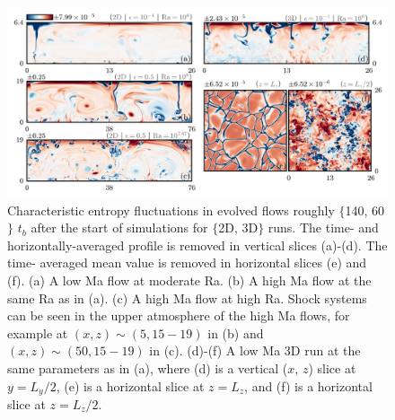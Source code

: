 \begin{figure}[t!]
\includegraphics[width=\textwidth]{./figs/snapshots_fig_raster.pdf}
\caption[Flow morphology of 2D, 3D, and low and high Mach number flows.]
{
	Characteristic entropy fluctuations in evolved flows roughly $\{$140, 60$\}$ $t_b$ after the start of simulations for $\{$2D, 3D$\}$ runs. 
	The time- and horizontally-averaged profile is removed in vertical slices (a)-(d). 
	The time- averaged mean value is removed in horizontal slices (e) and (f).
	(a) A low Ma flow at moderate Ra. 
	(b) A high Ma flow at the same Ra as in (a).
	(c) A high Ma flow at high Ra. 
	Shock systems can be seen in the upper atmosphere of the high Ma flows, for example at $(x, z) \sim (5, 15-19)$ in (b) and $(x, z) \sim (50, 15-19)$ in (c).
	(d)-(f) A low Ma 3D run at the same parameters as in (a), where (d) is a vertical ($x$, $z$) slice at $y = L_y/2$, (e) is a horizontal slice at $z = L_z$, and (f) is a horizontal slice at $z = L_z/2$.
	\label{fig:entropy_snapshots} 
}
\end{figure}



